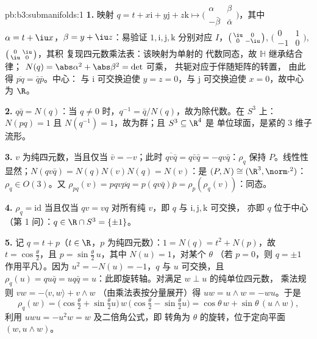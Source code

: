 \begin{solution}{pb:b3:submanifolds:1}
\textbf{1.} 映射 $q = t + x\mathrm i + y\mathrm j + z\mathrm k
\mapsto \bigl(\begin{smallmatrix}\alpha & \beta\\ -\bar\beta
& \bar\alpha\end{smallmatrix}\bigr)$，其中 $\alpha = t + \iu
x$，$\beta = y + \iu z$：易验证 $1, \mathrm i,
\mathrm j, \mathrm k$ 分别对应 $I$，$\bigl(\begin{smallmatrix}
\iu & 0\\ 0 & -\iu\end{smallmatrix}\bigr)$,
$\bigl(\begin{smallmatrix}0 & 1\\ -1 &
0\end{smallmatrix}\bigr)$, $\bigl(\begin{smallmatrix}0 &
\iu\\ \iu & 0\end{smallmatrix}\bigr)$，其积
复现四元数乘法表：该映射为单射的
代数同态，故 $\mathbb H$ 继承结合律；
$N(q) = \abs\alpha^2 + \abs\beta^2 = \det$ 可乘，
共轭对应于伴随矩阵的转置，
由此得 $\overline{pq} = \bar q\bar p$。中心：
与 $\mathrm i$ 可交换迫使 $y = z = 0$，与 $\mathrm j$ 可交换迫使
$x = 0$，故中心为 $\R$。

\textbf{2.} $q\bar q = N(q)$：当 $q \neq 0$ 时，$q^{-1} = \bar
q/N(q)$，故为除代数。在 $S^3$ 上：$N(pq) = 1$ 且
$N(q^{-1}) = 1$，故为群；且 $S^3 \subseteq \R^4$ 是
单位球面，是紧的 $3$ 维子流形。

\textbf{3.} $v$ 为纯四元数，当且仅当 $\bar v = -v$；此时
$\overline{qv\bar q} = q\bar v\bar q = -qv\bar q$：$\rho_q$
保持 $P$。线性性显然；$N(qv\bar q) =
N(q)N(v)N(q) = N(v)$：是 $(P, N) \cong (\R^3,
\norm\cdot^2)$：$\rho_q \in O(3)$。又 $\rho_{pq}(v) =
pqv\overline{pq} = p(qv\bar q)\bar p =
\rho_p(\rho_q(v))$：同态。

\textbf{4.} $\rho_q = \mathrm{id}$ 当且仅当 $qv = vq$ 对所有纯
$v$，即 $q$ 与 $\mathrm i, \mathrm j, \mathrm k$ 可交换，
亦即 $q$ 位于中心（第 1 问）：$q \in \R\cap S^3 =
\{\pm1\}$。

\textbf{5.} 记 $q = t + p$（$t \in \R$，$p$ 为纯四元数）：$1 =
N(q) = t^2 + N(p)$，故 $t = \cos\frac\theta2$，且 $p =
\sin\frac\theta2\,u$，其中 $N(u) = 1$，对某个 $\theta$
（若 $p = 0$，则 $q = \pm1$ 作用平凡）。因为 $u^2 = -N(u)
= -1$，$q$ 与 $u$ 可交换，且 $\rho_q(u) = qu\bar q =
uq\bar q = u$：此即旋转轴。对满足 $w \perp u$ 的纯单位四元数，
乘法规则 $vw = -\langle v, w\rangle + v\wedge w$
（由乘法表按分量展开）得 $uw = u\wedge w
= -wu$。于是
\[
\rho_q(w) = \bigl(\cos\tfrac\theta2 +
\sin\tfrac\theta2u\bigr)\,w\,\bigl(\cos\tfrac\theta2 -
\sin\tfrac\theta2u\bigr)
= \cos\theta\,w + \sin\theta\,(u\wedge w),
\]
利用 $uwu = -u^2w = w$ 及二倍角公式，即
转角为 $\theta$ 的旋转，位于定向平面 $(w,
u\wedge w)$。


\end{solution}
